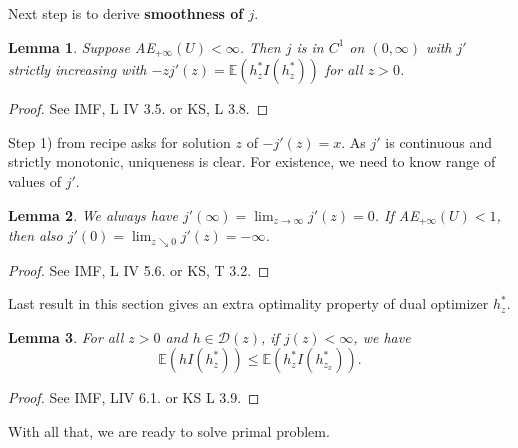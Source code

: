 \documentclass[12pt,a4paper, twoside]{article}
\newtheorem{lem}{Lemma}[section]
\theoremstyle{definition}
\newcommand{\EE}{\mathbb{E}} %
\begin{document}
\\\\
Next step is to derive \textbf{smoothness of $j$}.
\begin{lem} \label{L125} Suppose AE$_{+ \infty}(U) < \infty$. Then $j$ is in $C^1$ on $(0, \infty)$ with $j'$ strictly increasing with $-zj'(z)= \EE(h_z^* I(h_z^*))$ for all $z>0$. 
\end{lem}
\begin{proof}
See IMF, L IV 3.5. or KS, L 3.8.
\end{proof}
Step 1) from recipe asks for solution $z$ of $-j'(z)=x$. As $j'$ is continuous and strictly monotonic, uniqueness is clear. For existence, we need to know range of values of $j'$. 
\begin{lem} \label{L126} We always have $j'( \infty) = \lim_{z \to \infty} j'(z)= 0$. If AE$_{+ \infty}(U) <1$, then also $j'(0)= \lim_{z \searrow 0 } j'(z) = - \infty$. 
\end{lem}
\begin{proof}
See IMF, L IV 5.6. or KS, T 3.2.
\end{proof}
\noindent Last result in this section gives an extra optimality property of dual optimizer $h_z^*$. 
\begin{lem} \label{L127} For all $z>0$ and $h \in \mathcal{D}(z)$, if $j(z) < \infty$, we have $$\EE(hI(h_z^*)) \leq \EE(h_z^* I(h_{z_x}^*)).$$
\end{lem}
\begin{proof}
See IMF, LIV 6.1. or KS L 3.9.
\end{proof}
With all that, we are ready to solve primal problem. 
\newpage
\end{document}
